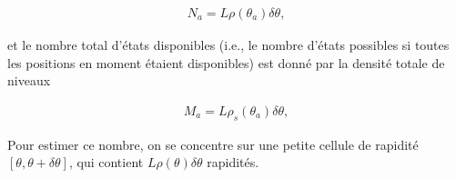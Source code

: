 \begin{eqnarray*}
	N_a = L\rho(\theta_a) \delta \theta,
\end{eqnarray*}

et le nombre total d'états disponibles (i.e., le nombre d’états possibles si toutes les positions en moment étaient disponibles) est donné par la densité totale de niveaux 

\begin{eqnarray*}
	M_a = L\rho_s(\theta_a) \delta \theta,
\end{eqnarray*}
	
	
	Pour estimer ce nombre, on se concentre sur une petite cellule de rapidité $[\theta, \theta+\delta\theta]$, qui contient $L\rho(\theta) \delta \theta$ rapidités. 
	
	\begin{figure}[H]
		\centering 
		\captionsetup{skip=10pt} %
	\end{figure}
	
	
	
